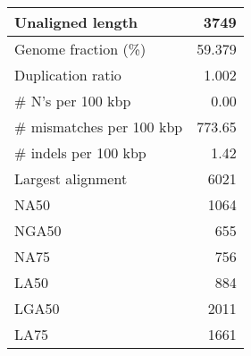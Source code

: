 \documentclass[12pt,a4paper]{article}
\begin{document}
\begin{table}[ht]
\begin{center}
\begin{tabular}{|l*{1}{|r}|}
Unaligned length & 3749 \\ \hline
Genome fraction (\%) & 59.379 \\ \hline
Duplication ratio & 1.002 \\ \hline
\# N's per 100 kbp & 0.00 \\ \hline
\# mismatches per 100 kbp & 773.65 \\ \hline
\# indels per 100 kbp & 1.42 \\ \hline
Largest alignment & 6021 \\ \hline
NA50 & 1064 \\ \hline
NGA50 & 655 \\ \hline
NA75 & 756 \\ \hline
LA50 & 884 \\ \hline
LGA50 & 2011 \\ \hline
LA75 & 1661 \\ \hline
\end{tabular}
\end{center}
\end{table}
\end{document}
